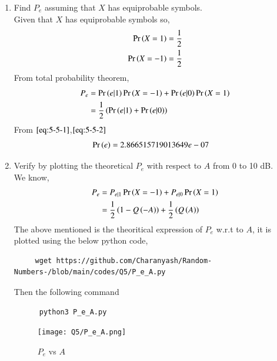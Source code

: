 \documentclass[journal,12pt,twocolumn]{IEEEtran}
\renewcommand\thesection{\arabic{section}}
\begin{document}
\begin{enumerate}[label=\thesection.\arabic*,ref=\thesection.\theenumi]
\begin{enumerate}[label=\thesection.\arabic*
,ref=\thesection.\theenumi]
\begin{align}
	  P_{e|1} &= \pr{\hat{X} = 1|X=-1}\\
                  &= \pr{ Y > 0| X=-1}\\
                  &= \pr{AX + N > 0 | X=1}\\
                  &= \pr{ N-A > 0}\\
                  &= \pr{N > A}\\
		  &= 1 - F_{N}\brak{A}\\
		  &= Q\brak{A}\\
		  &= 2.866515719235352e-07\label{eq:5-5-2}
  \end{align}
The above calculations are coded in below python file,
  \begin{lstlisting}
    wget  https://github.com/Charanyash/Random-Numbers-/tree/main/codes/Q5/5.5.py
  \end{lstlisting}
  Run the following command
  \begin{lstlisting}
   python3 5.5.py
  \end{lstlisting}
\item Find $P_e$ assuming that $X$ has equiprobable symbols.\\
 \solution Given that $X$ has equiprobable symbols so,
   \begin{align}
	   \Pr\left(X = 1\right) &= \frac{1}{2}\\
	   \Pr\left(X=-1\right)  &= \frac{1}{2}
   \end{align}
   	From total probability theorem,
   \begin{align}
	   P_{e} &= \Pr\left(e|1\right)\Pr\left(X = -1\right) + \Pr\left(e|0\right)\Pr\left(X=1\right)\\
		       &= \frac{1}{2}\left(\Pr\left(e|1\right) + \Pr\left(e|0\right)\right)
   \end{align}
From $\eqref{eq:5-5-1}$,$\eqref{eq:5-5-2}$
   \begin{align}
	   \Pr\left(e\right) &= 2.866515719013649e-07 
   \end{align}
\item
Verify by plotting  the theoretical $P_e$ with respect to $A$ from 0 to 10 dB.\\
 \solution
   We know,
     \begin{align}
	     P_e  &= P_{e|1}\Pr\left(X = -1\right) + P_{e|0}\Pr\left(X=1\right) \\
		  &= \frac{1}{2}\left( 1 - Q\left(-A\right)\right) + \frac{1}{2}\left(Q\left(A\right)\right)
     \end{align}
    The above mentioned is the theoritical expression of $P_e$ w.r.t to $A$, it is plotted using the below python code,
    \begin{lstlisting}
     wget https://github.com/Charanyash/Random-Numbers-/blob/main/codes/Q5/P_e_A.py
    \end{lstlisting}
Then the following command
    \begin{lstlisting}
      python3 P_e_A.py
    \end{lstlisting}
\begin{figure}
  \centering
  \texttt{[image: Q5/P\_e\_A.png]}
  \caption{$P_e$ vs $A$}
  \label{fig:P_e_A}
 \end{figure}
    

\end{enumerate}
\end{enumerate}
\end{document}
